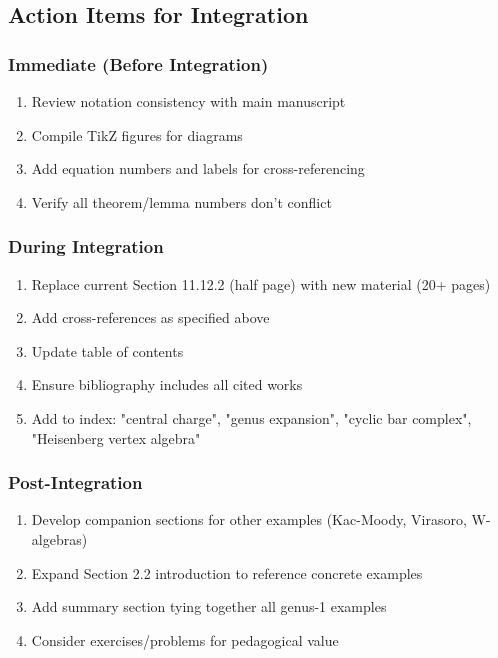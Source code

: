 \subsection{Action Items for Integration}

\subsubsection{Immediate (Before Integration)}
\begin{enumerate}
\item Review notation consistency with main manuscript
\item Compile TikZ figures for diagrams
\item Add equation numbers and labels for cross-referencing
\item Verify all theorem/lemma numbers don't conflict
\end{enumerate}

\subsubsection{During Integration}
\begin{enumerate}
\item Replace current Section 11.12.2 (half page) with new material (20+ pages)
\item Add cross-references as specified above
\item Update table of contents
\item Ensure bibliography includes all cited works
\item Add to index: "central charge", "genus expansion", "cyclic bar complex", "Heisenberg vertex algebra"
\end{enumerate}

\subsubsection{Post-Integration}
\begin{enumerate}
\item Develop companion sections for other examples (Kac-Moody, Virasoro, W-algebras)
\item Expand Section 2.2 introduction to reference concrete examples
\item Add summary section tying together all genus-1 examples
\item Consider exercises/problems for pedagogical value
\end{enumerate}

